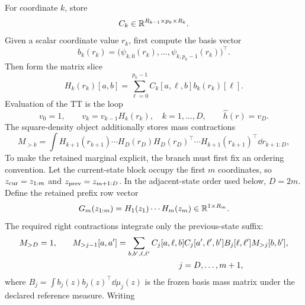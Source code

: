 For coordinate \(k\), store
\begin{equation}
  C_k\in\mathbb{R}^{R_{k-1}\times p_k\times R_k}.
  \label{eq:bf-hd-squared-tt-core-shape}
\end{equation}
Given a scalar coordinate value \(r_k\), first compute the basis vector
\begin{equation}
  b_k(r_k)=
  \bigl(\psi_{k,0}(r_k),\ldots,\psi_{k,p_k-1}(r_k)\bigr)^\top.
  \label{eq:bf-hd-squared-tt-basis-vector}
\end{equation}
Then form the matrix slice
\begin{equation}
  H_k(r_k)[a,b]
  =
  \sum_{\ell=0}^{p_k-1}C_k[a,\ell,b]b_k(r_k)[\ell].
  \label{eq:bf-hd-squared-tt-core-eval}
\end{equation}
Evaluation of the TT is the loop
\begin{equation}
  v_0=1,
  \qquad
  v_k=v_{k-1}H_k(r_k),\quad k=1,\ldots,D,
  \qquad
  \widehat h(r)=v_D.
  \label{eq:bf-hd-squared-tt-tt-eval}
\end{equation}
The square-density object additionally stores mass contractions
\begin{equation}
  M_{>k}
  =
  \int H_{k+1}(r_{k+1})\cdots H_D(r_D)
  H_D(r_D)^\top\cdots H_{k+1}(r_{k+1})^\top
  \dd r_{k+1:D},
  \label{eq:bf-hd-squared-tt-mass-contraction}
\end{equation}
To make the retained marginal explicit, the branch must first fix an ordering
convention.  Let the current-state block occupy the first \(m\) coordinates,
so \(z_{\rm cur}=z_{1:m}\) and \(z_{\rm prev}=z_{m+1:D}\).  In the adjacent-state
order used below, \(D=2m\).  Define the retained prefix row vector
\begin{equation}
  G_m(z_{1:m})=H_1(z_1)\cdots H_m(z_m)
  \in\mathbb{R}^{1\times R_m}.
  \label{eq:bf-hd-squared-tt-retained-prefix}
\end{equation}
The required right contractions integrate only the previous-state suffix:
\begin{equation}
\begin{aligned}
  M_{>D}=1,
  \qquad&
  M_{>j-1}[a,a']
  =
  \sum_{b,b',\ell,\ell'}
  C_j[a,\ell,b]
  C_j[a',\ell',b']
  B_j[\ell,\ell']
  M_{>j}[b,b'],\\
  &\hspace{45mm}j=D,\ldots,m+1,
\end{aligned}
  \label{eq:bf-hd-squared-tt-right-mass-recursion}
\end{equation}
where \(B_j=\int b_j(z)b_j(z)^\top\dd\mu_j(z)\) is the frozen basis
mass matrix under the declared reference measure.  Writing
